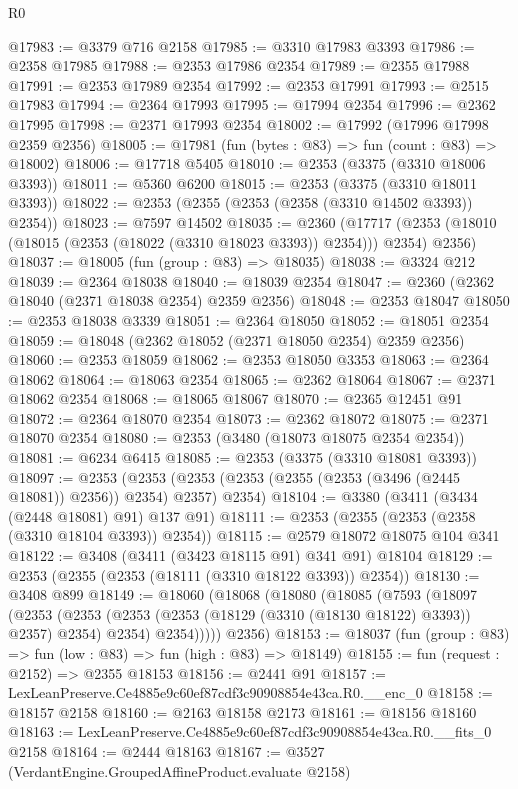 \begin{lexlean}{R0}
\begin{coremodule}
@17983 := @3379 @716 @2158
@17985 := @3310 @17983 @3393
@17986 := @2358 @17985
@17988 := @2353 @17986 @2354
@17989 := @2355 @17988
@17991 := @2353 @17989 @2354
@17992 := @2353 @17991
@17993 := @2515 @17983
@17994 := @2364 @17993
@17995 := @17994 @2354
@17996 := @2362 @17995
@17998 := @2371 @17993 @2354
@18002 := @17992 (@17996 @17998 @2359 @2356)
@18005 := @17981 (fun (bytes : @83) => fun (count : @83) => @18002)
@18006 := @17718 @5405
@18010 := @2353 (@3375 (@3310 @18006 @3393))
@18011 := @5360 @6200
@18015 := @2353 (@3375 (@3310 @18011 @3393))
@18022 := @2353 (@2355 (@2353 (@2358 (@3310 @14502 @3393)) @2354))
@18023 := @7597 @14502
@18035 := @2360
    (@17717 (@2353 (@18010 (@18015 (@2353 (@18022 (@3310 @18023 @3393)) @2354))) @2354) @2356)
@18037 := @18005 (fun (group : @83) => @18035)
@18038 := @3324 @212
@18039 := @2364 @18038
@18040 := @18039 @2354
@18047 := @2360 (@2362 @18040 (@2371 @18038 @2354) @2359 @2356)
@18048 := @2353 @18047
@18050 := @2353 @18038 @3339
@18051 := @2364 @18050
@18052 := @18051 @2354
@18059 := @18048 (@2362 @18052 (@2371 @18050 @2354) @2359 @2356)
@18060 := @2353 @18059
@18062 := @2353 @18050 @3353
@18063 := @2364 @18062
@18064 := @18063 @2354
@18065 := @2362 @18064
@18067 := @2371 @18062 @2354
@18068 := @18065 @18067
@18070 := @2365 @12451 @91
@18072 := @2364 @18070 @2354
@18073 := @2362 @18072
@18075 := @2371 @18070 @2354
@18080 := @2353 (@3480 (@18073 @18075 @2354 @2354))
@18081 := @6234 @6415
@18085 := @2353 (@3375 (@3310 @18081 @3393))
@18097 := @2353
    (@2353 (@2353 (@2353 (@2355 (@2353 (@3496 (@2445 @18081)) @2356)) @2354) @2357) @2354)
@18104 := @3380 (@3411 (@3434 (@2448 @18081) @91) @137 @91)
@18111 := @2353 (@2355 (@2353 (@2358 (@3310 @18104 @3393)) @2354))
@18115 := @2579 @18072 @18075 @104 @341
@18122 := @3408 (@3411 (@3423 @18115 @91) @341 @91) @18104
@18129 := @2353 (@2355 (@2353 (@18111 (@3310 @18122 @3393)) @2354))
@18130 := @3408 @899
@18149 := @18060
    (@18068
      (@18080
        (@18085
          (@7593
            (@18097
              (@2353
                (@2353 (@2353 (@2353 (@18129 (@3310 (@18130 @18122) @3393)) @2357) @2354) @2354)
                @2354)))))
      @2356)
@18153 := @18037 (fun (group : @83) => fun (low : @83) => fun (high : @83) => @18149)
@18155 := fun (request : @2152) => @2355 @18153
@18156 := @2441 @91
@18157 := LexLeanPreserve.Ce4885e9c60ef87cdf3c90908854e43ca.R0.__enc_0
@18158 := @18157 @2158
@18160 := @2163 @18158 @2173
@18161 := @18156 @18160
@18163 := LexLeanPreserve.Ce4885e9c60ef87cdf3c90908854e43ca.R0.__fits_0 @2158
@18164 := @2444 @18163
@18167 := @3527 (VerdantEngine.GroupedAffineProduct.evaluate @2158)

\end{coremodule}
\end{lexlean}
